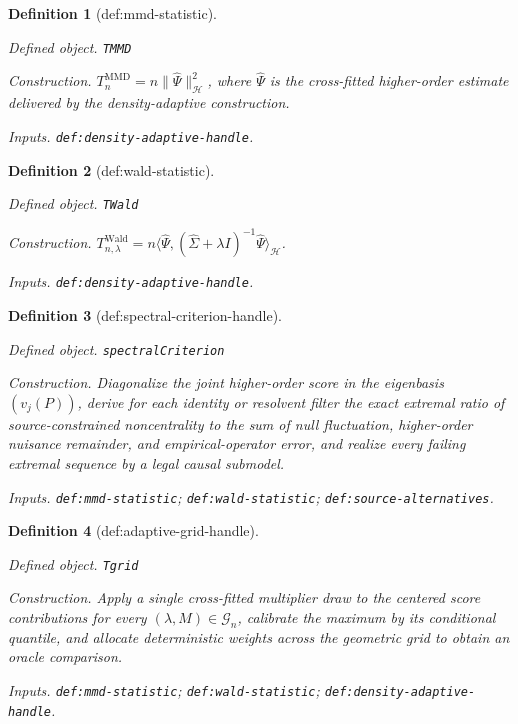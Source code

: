 \documentclass{article}
\newtheorem{definition}{Definition}
\begin{document}
\begin{definition}[def:mmd-statistic]\label{def:mmd-statistic}
\par\smallskip\noindent\emph{Defined object.} \texttt{TMMD}
\par\smallskip\noindent\emph{Construction.} \(T_n^{\mathrm{MMD}}=n\|\widehat\Psi\|_{\mathcal H}^2\), where \(\widehat\Psi\) is the cross-fitted higher-order estimate delivered by the density-adaptive construction.
\par\smallskip\noindent\emph{Inputs.} \texttt{def:\allowbreak{}density-\allowbreak{}adaptive-\allowbreak{}handle}.
\end{definition}

\begin{definition}[def:wald-statistic]\label{def:wald-statistic}
\par\smallskip\noindent\emph{Defined object.} \texttt{TWald}
\par\smallskip\noindent\emph{Construction.} \(T_{n,\lambda}^{\mathrm{Wald}}=n\langle\widehat\Psi,(\widehat\Sigma+\lambda I)^{-1}\widehat\Psi\rangle_{\mathcal H}\).
\par\smallskip\noindent\emph{Inputs.} \texttt{def:\allowbreak{}density-\allowbreak{}adaptive-\allowbreak{}handle}.
\end{definition}

\begin{definition}[def:spectral-criterion-handle]\label{def:spectral-criterion-handle}
\par\smallskip\noindent\emph{Defined object.} \texttt{spectralCriterion}
\par\smallskip\noindent\emph{Construction.} Diagonalize the joint higher-order score in the eigenbasis \((v_j(P))\), derive for each identity or resolvent filter the exact extremal ratio of source-constrained noncentrality to the sum of null fluctuation, higher-order nuisance remainder, and empirical-operator error, and realize every failing extremal sequence by a legal causal submodel.
\par\smallskip\noindent\emph{Inputs.} \texttt{def:\allowbreak{}mmd-\allowbreak{}statistic}; \texttt{def:\allowbreak{}wald-\allowbreak{}statistic}; \texttt{def:\allowbreak{}source-\allowbreak{}alternatives}.
\end{definition}

\begin{definition}[def:adaptive-grid-handle]\label{def:adaptive-grid-handle}
\par\smallskip\noindent\emph{Defined object.} \texttt{Tgrid}
\par\smallskip\noindent\emph{Construction.} Apply a single cross-fitted multiplier draw to the centered score contributions for every \((\lambda,M)\in\mathcal G_n\), calibrate the maximum by its conditional quantile, and allocate deterministic weights across the geometric grid to obtain an oracle comparison.
\par\smallskip\noindent\emph{Inputs.} \texttt{def:\allowbreak{}mmd-\allowbreak{}statistic}; \texttt{def:\allowbreak{}wald-\allowbreak{}statistic}; \texttt{def:\allowbreak{}density-\allowbreak{}adaptive-\allowbreak{}handle}.
\end{definition}
\end{document}
